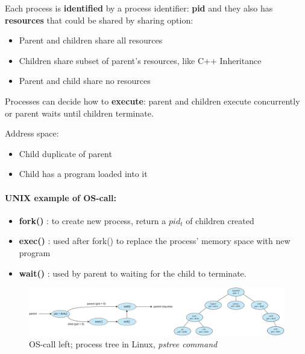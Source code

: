 Each process is \textbf{identified} by a process identifier: \textbf{pid} and they also has \textbf{resources} that could be shared by sharing option:

\begin{itemize}
    \item Parent and children share all resources
    \item Children share subset of parent's resources, like C++ Inheritance
    \item Parent and child share no resources
\end{itemize}

Processes can decide how to \textbf{execute}: parent and children execute concurrently or parent waits until children terminate.

Address space: 
\begin{itemize}
    \item Child duplicate of parent
    \item Child has a program loaded into it
\end{itemize}

\paragraph{UNIX example of OS-call:}
\begin{itemize}
    \item \textbf{fork()} : to create new process, return a $pid_t$ of children created
    \item \textbf{exec()} : used after fork() to replace the process' memory space with new program
    \item \textbf{wait()} : used by parent to waiting for the child to terminate.
\end{itemize}


\begin{figure}[htbp]
    \centering
    \includegraphics[width=1\linewidth]{img/process.png}
    \caption{OS-call left; process tree in Linux, \textit{pstree command}}    
\end{figure}


